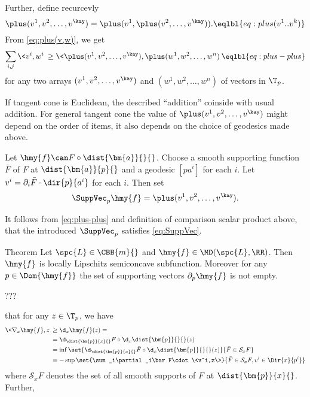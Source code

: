 Further, define recurcevly 
$$\plus(v^1,v^2,\dots,v^\kay)=\plus(v^1,\plus(v^2,\dots,v^\kay)).
\eqlbl{eq:plus(v^1..v^k)}$$
From \ref{eq:plus(v,w)}, we get
$$\sum_{i,j}\<v^i,w^i\>
\ge
\<\plus(v^1,v^2,\dots,v^\kay),\plus(w^1,w^2,\dots,w^n)\>\eqlbl{eq:plus-plus}$$
for any two arrays $(v^1,v^2,\dots,v^\kay)$ and $(w^1,w^2,\dots,w^n)$ of vectors in $\T_p$.

If tangent cone is Euclidean, the described ``addition'' coinside with usual addition.
For general tangent cone the value of $\plus(v^1,v^2,\dots,v^\kay)$ might depend on the order of items, it also depends on the choice of geodesics made above.


Let $\hmy{f}\can F\circ\dist{\bm{a}}{}{}$.
Choose a smooth supporting function $\bar F$ of $F$ at 
$\dist{\bm{a}}{p}{}$ and a geodesic $[pa^i]$ for each $i$.
Let $v^i=\partial_i\bar F\cdot \dir{p}{a^i}$ for each $i$.
Then set 
$$\SuppVec_p\hmy{f}=\plus(v^1,v^2,\dots,v^\kay).$$

It follows from \ref{eq:plus-plus} and definition of comparison scalar product above,
that the introduced $\SuppVec_p$ satisfies \ref{eq:SuppVec}.
\qeds














\begin{thm}{Theorem}
Let $\spc{L}\in\CBB{m}{}$ and $\hmy{f}\in\MD(\spc{L},\RR)$.
Then $\hmy{f}$ is locally Lipschitz semiconcave subfunction.
Moreover for any $p\in\Dom{\hmy{f}}$ the set of supporting vectors $\partial_p\hmy{f}$ is not empty.
\end{thm}

???\qeds







that for any $z\in\T_p$, we have
\begin{align*}
\<\nabla_x\hmy{f},z\>
&\ge
\d_x\hmy{f}(z)=
\\
&=\d_{\dist{\bm{p}}{x}{}}F\circ\d_x\dist{\bm{p}}{}{}(z)
\\
&=
\inf
\set{\d_{\dist{\bm{p}}{x}{}}\bar F\circ\d_x\dist{\bm{p}}{}{}(z)}%
{\bar F\in\mathcal{S}_xF}
\\
&=
-\sup
\set{\sum_i\partial_i\bar F\cdot\<v^i,z\>}%
{\bar F\in\mathcal{S}_xF, v^i\in\Dir{x}{p^i}}
\end{align*}
where $\mathcal{S}_xF$ denotes the set of all smooth supports of $F$ at $\dist{\bm{p}}{x}{}$.
Further, 






